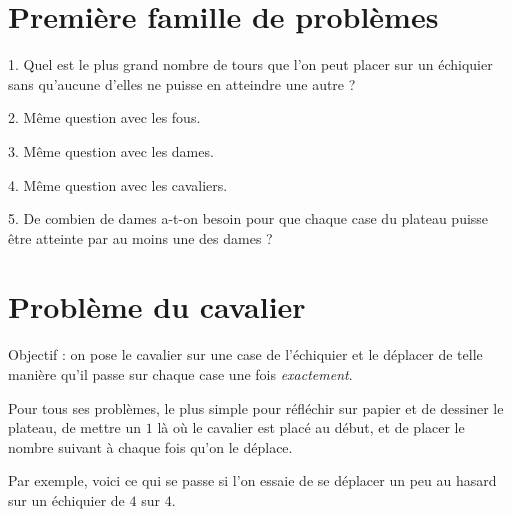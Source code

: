 \documentclass[12 pt]{article}
\theoremstyle{plain}
\newcounter{n}
\numberwithin{n}{section}
\begin{document}
\section{Première famille de problèmes}

1. Quel est le plus grand nombre de tours que l'on peut placer sur un échiquier sans qu'aucune d'elles ne puisse
en atteindre une autre ? 

2. Même question avec les fous. 

3. Même question avec les dames. 

4. Même question avec les cavaliers. 

5. De combien de dames a-t-on besoin pour que chaque case du plateau puisse être atteinte par au moins une des dames ?

\section{Problème du cavalier}

Objectif : on pose le cavalier sur une case de l'échiquier et le déplacer de telle manière qu'il passe sur 
chaque case une fois \emph{exactement}. 

Pour tous ses problèmes, le plus simple pour réfléchir sur papier et de dessiner le plateau, de mettre un $1$ là où
le cavalier est placé au début, et de placer le nombre suivant à chaque fois qu'on le déplace. 

Par exemple, voici ce qui se passe si l'on essaie de se déplacer un peu au hasard sur un échiquier de $4$ sur $4$. 
\end{document}
